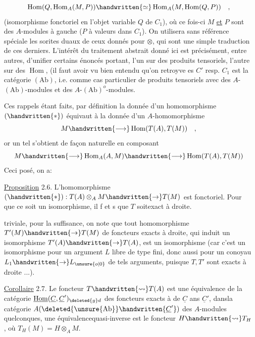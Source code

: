 \[
\operatorname{Hom}(Q,\operatorname{Hom}_A(M,P))\handwritten{\simeq}\operatorname{Hom}_A(M,\operatorname{Hom}(Q,P))\quad,
\]
(isomorphisme fonctoriel en l'objet variable $Q$ de $C_1$), où ce fois-ci $M$ \uline{et}
$P$ sont des $A$-modules à gauche ($P$ à valeurs dans $C_1$). On utilisera sans
référence spéciale les sorites duaux de ceux donnés pour $\otimes$, qui sont une
simple traduction de ces derniers. L'intérêt du traitement abstrait donné
ici est précisément, entre autres, d'unifier certains énoncés  portant, 
l'un sur des produits tensoriels, l'autre sur des $\operatorname{Hom}$,
(il faut avoir vu bien entendu qu'on retroyve es 
$C'$ resp. $C_1$ est la catégorie $(\mathrm{Ab})$, i.e. comme cas particulier de produits
tensoriels avec des $A$-$(\mathrm{Ab})$-modules et des $A$-$(\mathrm{Ab})^{o}$-modules\handwritten{)}.

Ces rappels étant faits, par définition la donnée d'un homomorphisme
$(\handwritten{*})$ équivaut à la donnée d'un $A$-homomorphisme
\[
M\handwritten{\longrightarrow}\operatorname{Hom}(T(A),T(M))\quad,
\]
or un tel s'obtient de façon naturelle en composant
\[
M\handwritten{\longrightarrow}\operatorname{Hom}_A(A,M)\handwritten{\longrightarrow}\operatorname{Hom}(T(A),T(M))
\]
Ceci posé, on a:

\uline{Proposition} 2.6. L'homomorphisme $(\handwritten{*}):T(A)\otimes_A M\handwritten{\to}T(M)$ est fonctoriel.
Pour que ce soit un isomorphisme, il f et s que $T$ soit\handwritten{\unsure{/}}exact à droite.

 triviale, pour la suffisance, on note que tout homomorphisme  $T'(M)\handwritten{\to}T(M)$ de foncteurs exacts à droite, qui induit un isomorphisme $T'(A)\handwritten{\to}T(A)$, est un isomorphisme  (car c'est un isomorphisme
pour un argument $L$ libre de type fini, donc aussi pour un conoyau
$L_1\handwritten{\to}L_{\unsure{o|0}}$ de tels arguments, puisque $T,T'$ sont exacts à droite ...).

\uline{Corollaire} 2.7. Le foncteur $T\handwritten{\leadsto}T(A)$ est une équivalence de la catégorie
 $\underline{\operatorname{Hom}}(\underline C,\underline C')_{\deleted{g}d}$ des foncteurs exacts à  de $\underline C$ ans $\underline C'$, dans\handwritten{\unsure{/}}la
catégorie $A(\deleted{\unsure{\mathrm{Ab}}}\handwritten{\underline C'})$ des $A$-modules quelconques, une équivalence\handwritten{\unsure{/}}quasi-inverse
est le foncteur $H\handwritten{\leadsto}T_H$, où $T_H(M)=H\otimes_A M$.

